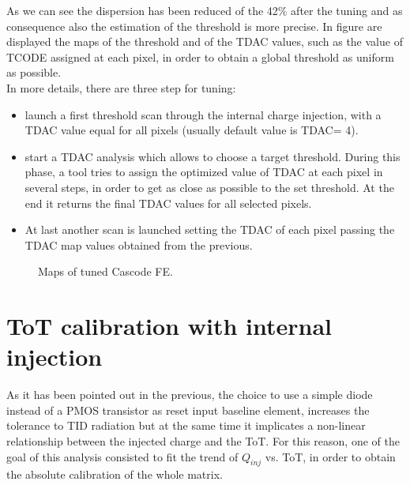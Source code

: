 As we can see the dispersion has been reduced of the 42\% after the tuning and as consequence also the estimation of the threshold is more precise. In figure  are displayed the maps of the threshold and of the TDAC values, such as the value of TCODE assigned at each pixel, in order to obtain a global threshold as uniform as possible. \\
In more details, there are three step for tuning:

\begin{itemize}
\item launch a first threshold scan through the internal charge injection, with a TDAC value equal for all pixels (usually default value is TDAC= 4).
\item start a TDAC analysis which allows to choose a target threshold. During this phase, a tool tries to assign the optimized value of TDAC at each pixel in several steps, in order to get as close as possible to the set threshold. At the end it returns the final TDAC values for all selected pixels.
\item At last another scan is launched setting the TDAC of each pixel passing the TDAC map values obtained from the previous. 
\end{itemize}

\begin{figure}[h!]
\centering
{}\quad
{}\quad
\caption{Maps of tuned Cascode FE.}
\label{fig:casc_maps_tune}
\end{figure}


\section{ToT calibration with internal injection}



As it has been pointed out in the previous, the choice to use a simple diode instead of a PMOS transistor as reset input baseline element, increases the tolerance to TID radiation but at the same time it implicates a non-linear relationship between the injected charge and the ToT.  For this reason, one of the goal of this analysis consisted to fit the trend of $Q_{inj}$ vs. ToT, in order to obtain the absolute calibration of the whole matrix.


